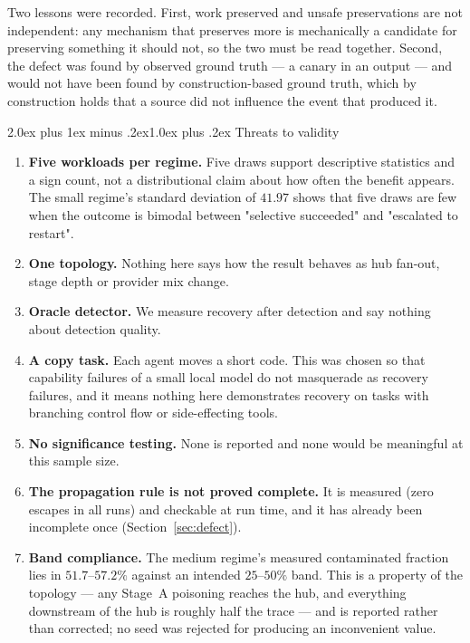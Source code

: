 \documentclass[10pt,twocolumn,a4paper]{article}
\makeatletter
\renewcommand{\subsection}{\@startsection{subsection}{2}{\z@}%
  {2.0ex plus 1ex minus .2ex}{1.0ex plus .2ex}%
  {\normalfont\normalsize\itshape}}
\makeatother
\begin{document}
Two lessons were recorded. First, work preserved and unsafe preservations are
not independent: any mechanism that preserves more is mechanically a candidate
for preserving something it should not, so the two must be read together.
Second, the defect was found by observed ground truth --- a canary in an output
--- and would not have been found by construction-based ground truth, which by
construction holds that a source did not influence the event that produced it.

\subsection{Threats to validity}

\begin{enumerate}
\item \textbf{Five workloads per regime.} Five draws support descriptive
statistics and a sign count, not a distributional claim about how often the
benefit appears. The small regime's standard deviation of $41.97$ shows that
five draws are few when the outcome is bimodal between "selective succeeded"
and "escalated to restart".
\item \textbf{One topology.} Nothing here says how the result behaves as hub
fan-out, stage depth or provider mix change.
\item \textbf{Oracle detector.} We measure recovery after detection and say
nothing about detection quality.
\item \textbf{A copy task.} Each agent moves a short code. This was chosen so
that capability failures of a small local model do not masquerade as recovery
failures, and it means nothing here demonstrates recovery on tasks with
branching control flow or side-effecting tools.
\item \textbf{No significance testing.} None is reported and none would be
meaningful at this sample size.
\item \textbf{The propagation rule is not proved complete.} It is measured
(zero escapes in all runs) and checkable at run time, and it has already been
incomplete once (Section~\ref{sec:defect}).
\item \textbf{Band compliance.} The medium regime's measured contaminated
fraction lies in $51.7$--$57.2\%$ against an intended $25$--$50\%$ band. This is
a property of the topology --- any Stage~A poisoning reaches the hub, and
everything downstream of the hub is roughly half the trace --- and is reported
rather than corrected; no seed was rejected for producing an inconvenient value.
\end{enumerate}
\end{document}

